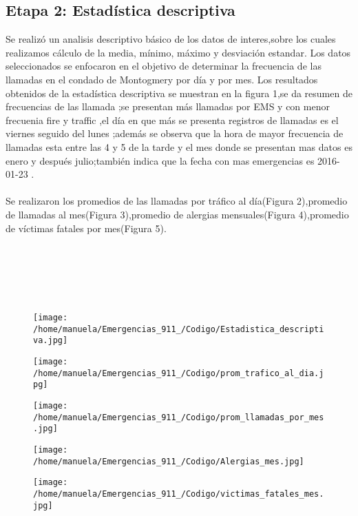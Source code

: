 \documentclass[11pt]{article}
\begin{document}
\subsection{Etapa 2: Estadística descriptiva}
Se realizó un analisis descriptivo básico de los datos de interes,sobre los cuales realizamos cálculo de la media, mínimo, máximo y desviación estandar.
Los datos seleccionados se enfocaron en el objetivo de determinar la frecuencia de las llamadas en el condado de Montogmery por día y por mes.
Los resultados obtenidos de la estadística descriptiva se muestran en la figura 1,se da resumen de frecuencias de las llamada ;se presentan más llamadas por EMS y con menor frecuenia fire y traffic ,el día en que más se presenta registros de llamadas es el  viernes  seguido del lunes ;además se observa que la hora de mayor frecuencia de llamadas esta  entre las 4 y 5 de la tarde y el mes donde se presentan mas datos es enero y después julio;también indica que la fecha con mas emergencias es  2016-01-23 . 
\\ 
\\ 
Se realizaron los promedios de las llamadas por tráfico al día(Figura 2),promedio de llamadas al mes(Figura 3),promedio de alergias mensuales(Figura 4),promedio de víctimas fatales por mes(Figura 5).
\\ 
\\ 
\\ 
\\ 
\\ 
\\ 

\begin{figure}[htp]
\centering
\texttt{[image: /home/manuela/Emergencias\_911\_/Codigo/Estadistica\_descriptiva.jpg]}
\caption{}
\label{}
\end{figure}
\begin{figure}[htp]
\centering
\texttt{[image: /home/manuela/Emergencias\_911\_/Codigo/prom\_trafico\_al\_dia.jpg]}
\caption{}
\label{}
\end{figure}
\begin{figure}[htp]
\centering
\texttt{[image: /home/manuela/Emergencias\_911\_/Codigo/prom\_llamadas\_por\_mes.jpg]}
\caption{}
\label{}
\end{figure}
\begin{figure}[htp]
\centering
\texttt{[image: /home/manuela/Emergencias\_911\_/Codigo/Alergias\_mes.jpg]}
\caption{}
\label{}
\end{figure}
\begin{figure}[htp]
\centering
\texttt{[image: /home/manuela/Emergencias\_911\_/Codigo/victimas\_fatales\_mes.jpg]}
\caption{}
\label{}
\end{figure}
\
\end{document}
